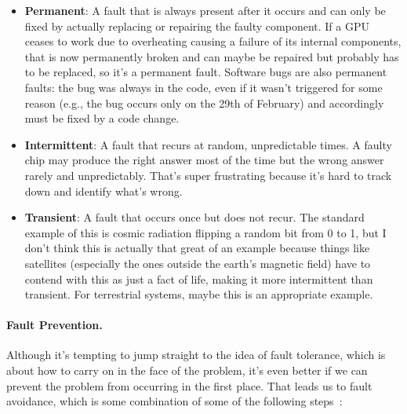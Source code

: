 \begin{itemize}
	\item \textbf{Permanent}: A fault that is always present after it occurs and can only be fixed by actually replacing or repairing the faulty component. If a GPU ceases to work due to overheating causing a failure of its internal components, that is now permanently broken and can maybe be repaired but probably has to be replaced, so it's a permanent fault. Software bugs are also permanent faults: the bug was always in the code, even if it wasn't triggered for some reason (e.g., the bug occurs only on the 29th of February) and accordingly must be fixed by a code change.
	
	\item \textbf{Intermittent}: A fault that recurs at random, unpredictable times. A faulty chip may produce the right answer most of the time but the wrong answer rarely and unpredictably. That's super frustrating because it's hard to track down and identify what's wrong.

	\item \textbf{Transient}: A fault that occurs once but does not recur. The standard example of this is cosmic radiation flipping a random bit from 0 to 1, but I don't think this is actually that great of an example because things like satellites (especially the ones outside the earth's magnetic field) have to contend with this as just a fact of life, making it more intermittent than transient. For terrestrial systems, maybe this is an appropriate example.

\end{itemize}

\paragraph{Fault Prevention.} 
Although it's tempting to jump straight to the idea of fault tolerance, which is about how to carry on in the face of the problem, it's even better if we can prevent the problem from occurring in the first place. That leads us to fault avoidance, which is some combination of some of the following steps~\cite{mte241}:

